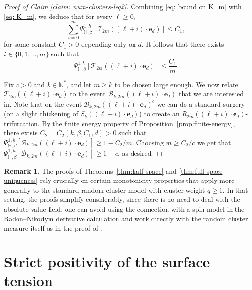 \documentclass[11pt,a4paper]{article}
\numberwithin{equation}{section}
\theoremstyle{plain}
\theoremstyle{definition}
\newtheorem{Rem}[Thm]{Remark}
\begin{document}
\begin{proof}[Proof of Claim \textup{\ref{claim: num-clusters-leq2}}]
Combining \eqref{eq: bound on K_m} with \eqref{eq: K_m}, we deduce that for every $\ell\ge 0$,
\begin{equation}\sum_{i=0}^m \Psi^{1,h}_{\mathbb{H},\beta}[\mathcal{T}_{2m}((\ell+i)\cdot\mathbf{e}_d)]\le C_1,
\end{equation}
for some constant $C_1>0$ depending only on $d$. It follows that there exists $i\in \{0,1,\ldots,m\}$ such that 
\begin{equation}
\Psi^{1,h}_{\mathbb{H},\beta}[\mathcal{T}_{2m}((\ell+i)\cdot \mathbf{e}_d)]\le \frac{C_1}{m}.
\end{equation}

Fix $c>0$ and $k\in \mathbb N^*$, and let $m\geq k$ to be chosen large enough. We now relate $\mathcal{T}_{2m}((\ell+i)\cdot \mathbf{e}_d)$ to the event $\mathcal{B}_{k,2m}((\ell+i)\cdot \mathbf{e}_d)$ that we are interested in. Note that on the event $\mathcal{B}_{k,2m}((\ell+i)\cdot \mathbf{e}_d)^c$ we can do a standard surgery (on a slight thickening of $S_k((\ell+i)\cdot\mathbf{e}_d)$) to create an $R_{2m}((\ell+i)\cdot \mathbf{e}_d)$-trifurcation. By the finite energy property of Proposition~\ref{prop:finite-energy}, there exists $C_2=C_2(k,\beta,C_1,d)>0$ such that $\Psi^{1,h}_{\mathbb{H},\beta}[\mathcal{B}_{k,2m}((\ell+i)\cdot \mathbf{e}_d)]\ge 1-C_2/m$. Choosing $m\geq C_2/c$ we get that $\Psi^{1,h}_{\mathbb{H},\beta}[\mathcal{B}_{k,2m}((\ell+i)\cdot \mathbf{e}_d)]\ge 1-c$, as desired.
\end{proof}



\begin{Rem}\label{rem:FK_adaptation}
The proofs of Theorems~\ref{thm:half-space} and \ref{thm:full-space uniqueness} rely crucially on certain monotonicity properties that apply more generally to the standard random-cluster model with cluster weight $q\ge 1$. In that setting, the proofs simplify considerably, since there is no need to deal with the absolute-value field: one can avoid using the connection with a spin model in the Radon--Nikodym derivative calculation and work directly with the random cluster measure itself as in the proof of \cite[Theorem 1.12]{DuminilLecturesOnIsingandPottsModels2019}. 
\end{Rem}



\section{Strict positivity of the surface tension}\label{sec:surface_tension}
\end{document}
